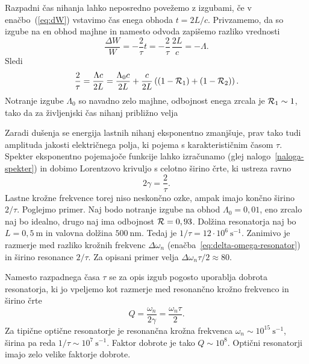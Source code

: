 Razpadni čas nihanja lahko neposredno povežemo z izgubami, če v enačbo~(\ref{eq:dW})
vstavimo čas enega obhoda $t=2L/c$. Privzamemo, da so izgube na en obhod majhne in namesto 
odvoda zapišemo razliko vrednosti
\begin{equation}
\frac{\Delta W}{W}= -\frac{2}{\tau} t = -\frac{2}{\tau}\, \frac{2L}{c} = -\Lambda.
\end{equation}
Sledi
\begin{equation}
\frac{2}{\tau}=\frac{\Lambda c}{2L}=\frac{\Lambda_0c}{2L}+\frac{c}{2L}\left((1-{\cal R}_{1})
+(1-{\cal R}_{2})\right).
\label{taulambda}
\end{equation}
Notranje izgube $\Lambda_0$ so navadno zelo majhne, 
odbojnost enega zrcala je ${\cal R}_{1} \sim 1$, tako da za življenjski čas 
nihanj približno velja

Zaradi dušenja se energija lastnih nihanj eksponentno zmanjšuje, prav tako tudi
amplituda jakosti električnega polja, ki pojema s karakterističnim časom $\tau$. 
Spekter eksponentno pojemajoče funkcije lahko izračunamo
(glej nalogo~\ref{naloga-spekter}) in dobimo Lorentzovo krivuljo 
s celotno širino črte, ki ustreza ravno
\begin{equation}
2\gamma=\frac{2}{\tau}.
\label{3.26}
\end{equation}
Lastne krožne frekvence torej niso neskončno ozke, ampak imajo končno širino $2/\tau$.
Poglejmo primer. Naj bodo notranje izgube na obhod $\Lambda_0=0,01$,
eno zrcalo naj bo idealno, drugo naj ima odbojnost ${\cal R}=0,93$. Dolžina
resonatorja naj bo $L=0,5~\si{\metre}$ in valovna dolžina $500~\si{\nano\metre}$. Tedaj
je $1/\tau=12\cdot10^{6}~\si{\second}^{-1}$. Zanimivo je razmerje med 
razliko krožnih frekvenc $\Delta \omega_n$ 
(enačba~\ref{eq:delta-omega-resonator}) in širino resonance $2/\tau$. 
Za opisani primer velja $\Delta\omega_n\tau/2 \approx 80$.

\begin{remark}
Namesto razpadnega časa $\tau$ se za opis izgub pogosto uporablja
dobrota resonatorja, ki jo vpeljemo kot
razmerje med resonančno krožno frekvenco in širino črte 
\begin{equation}
Q=\frac{\omega_{n}}{2\gamma} = \frac{\omega_{n}\tau}{2}.
\end{equation}
Za tipične optične resonatorje je resonančna krožna
frekvenca $\omega_n \sim 10^{15}~\si{\second}^{-1}$, širina pa reda 
 $1/\tau \sim 10^{7}~\si{\second}^{-1}$. Faktor dobrote je tako $Q \sim 10^{8}$. Optični 
 resonatorji imajo zelo velike faktorje dobrote.
\end{remark}

